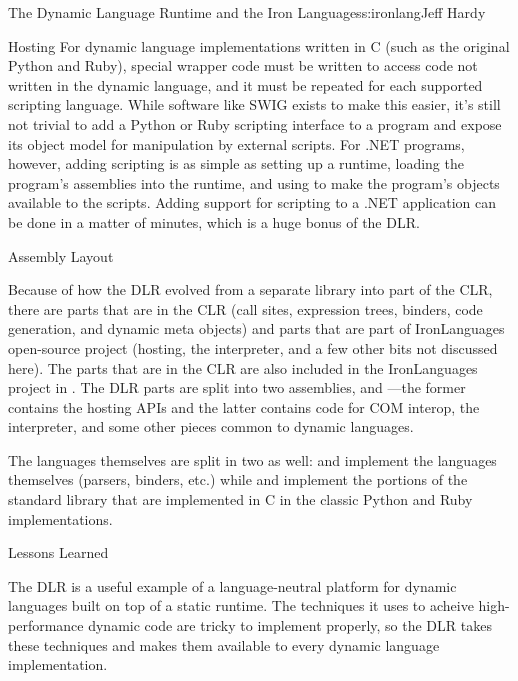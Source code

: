 \begin{aosachapter}{The Dynamic Language Runtime and the Iron Languages}{s:ironlang}{Jeff Hardy}
\begin{aosasect1}{Hosting}
For dynamic language implementations written in C (such as the original Python and Ruby), special wrapper code must be written to access code not written in the dynamic language, and it must be repeated for each supported scripting language. While software like SWIG exists to make this easier, it's still not trivial to add a Python or Ruby scripting interface to a program and expose its object model for manipulation by external scripts. For .NET programs, however, adding scripting is as simple as setting up a runtime, loading the program's assemblies into the runtime, and using  to make the program's objects available to the scripts. Adding support for scripting to a .NET application can be done in a matter of minutes, which is a huge bonus of the DLR.

\end{aosasect1}

\begin{aosasect1}{Assembly Layout}

Because of how the DLR evolved from a separate library into part of the CLR, there are parts that are in the CLR (call sites, expression trees, binders, code generation, and dynamic meta objects) and parts that are part of IronLanguages open-source project (hosting, the interpreter, and a few other bits not discussed here). The parts that are in the CLR are also included in the IronLanguages project in . The DLR parts are split into two assemblies,  and ---the former contains the hosting APIs and the latter contains code for COM interop, the interpreter, and some other pieces common to dynamic languages.

The languages themselves are split in two as well:  and  implement the languages themselves (parsers, binders, etc.) while  and  implement the portions of the standard library that are implemented in C in the classic Python and Ruby implementations.

\end{aosasect1}

\begin{aosasect1}{Lessons Learned}

The DLR is a useful example of a language-neutral platform for dynamic languages built on top of a static runtime. The techniques it uses to acheive high-performance dynamic code are tricky to implement properly, so the DLR takes these techniques and makes them available to every dynamic language implementation.


\end{aosasect1}
\end{aosachapter}
